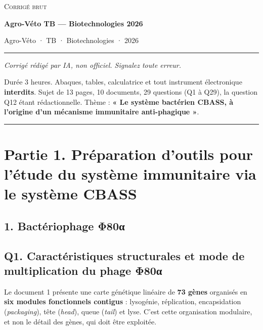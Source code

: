 \documentclass[11pt,a4paper]{article}
\begin{document}
\thispagestyle{plain}
\begin{center}
  {\small\scshape Corrigé brut}\par\smallskip
  {\LARGE\bfseries Agro-Véto TB — Biotechnologies 2026\par}\medskip
  {\large Agro-Véto · TB · Biotechnologies · 2026\par}
\end{center}
\vspace{2pt}\hrule\vspace{8pt}

\emph{Corrigé rédigé par IA, non officiel. Signalez toute erreur.}

Durée 3 heures. Abaques, tables, calculatrice et tout instrument électronique \textbf{interdits}. Sujet de 13 pages, 10 documents, 29 questions (Q1 à Q29), la question Q12 étant rédactionnelle. Thème : \textbf{« Le système bactérien CBASS, à l'origine d'un mécanisme immunitaire anti-phagique »}.

\begin{center}\rule{0.5\linewidth}{0.5pt}\end{center}

\hypertarget{partie-1.-pruxe9paration-doutils-pour-luxe9tude-du-systuxe8me-immunitaire-via-le-systuxe8me-cbass}{%
\section{Partie 1. Préparation d'outils pour l'étude du système immunitaire via le système CBASS}\label{partie-1.-pruxe9paration-doutils-pour-luxe9tude-du-systuxe8me-immunitaire-via-le-systuxe8me-cbass}}

\hypertarget{bactuxe9riophage-ux3c680ux3b1}{%
\subsection{1. Bactériophage Φ80α}\label{bactuxe9riophage-ux3c680ux3b1}}

\hypertarget{q1.-caractuxe9ristiques-structurales-et-mode-de-multiplication-du-phage-ux3c680ux3b1}{%
\subsection{Q1. Caractéristiques structurales et mode de multiplication du phage Φ80α}\label{q1.-caractuxe9ristiques-structurales-et-mode-de-multiplication-du-phage-ux3c680ux3b1}}

Le document 1 présente une carte génétique linéaire de \textbf{73 gènes} organisés en \textbf{six modules fonctionnels contigus} : lysogénie, réplication, encapsidation (\emph{packaging}), tête (\emph{head}), queue (\emph{tail}) et lyse. C'est cette organisation modulaire, et non le détail des gènes, qui doit être exploitée.
\end{document}
